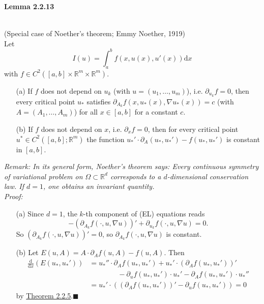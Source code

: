 \hypertarget{lemma_2_2_13}{\textbf{Lemma 2.2.13}}\\
(Special case of Noether's theorem; Emmy Noether, 1919)\\
Let
\[I(u)=\int_a^b{f(x,u(x),u'(x))\mathrm{d}x}\]
with $f\in C^2([a,b]\times\mathbb{R}^m\times\mathbb{R}^m)$.
\begin{itemize}
	\item[(a)] If $f$ does not depend on $u_k$ (with $u=(u_1,\dotsc,u_m)$), i.e. $\partial_{u_k}f=0$, then every critical point $u_*$ satisfies $\partial_{A_k}f(x,u_*(x),\nabla u_*(x))=c$ (with $A=(A_1,\dotsc,A_m)$) for all $x\in[a,b]$ for a constant $c$.
	\item[(b)] If $f$ does not depend on $x$, i.e. $\partial_xf=0$, then for every critical point $u^*\in C^2([a,b];\mathbb{R}^m)$ the function $u_*'\cdot\partial_A(u_*,u_*')-f(u_*,u_*')$ is constant in $[a,b]$.\\
\end{itemize}

\textit{Remark: In its general form, Noether's theorem says: Every continuous symmetry of variational problem on $\Omega\subset\mathbb{R}^d$ corresponds to a $d$-dimensional conservation law. If $d=1$, one obtains an invariant quantity.}\\

\textit{Proof:}
\begin{itemize}
	\item[(a)] Since $d=1$, the $k$-th component of (EL) equations reads
	\[-\left(\partial_{A_k}f(\cdot,u,\nabla u)\right)'+\partial_{u_k}f(\cdot,u,\nabla u)=0.\]
	So $\left(\partial_{A_k}f(\cdot,u,\nabla u)\right)'=0$, so $\partial_{A_k}f(\cdot,u,\nabla u)$ is constant.
	\item[(b)] Let $E(u,A)=A\cdot\partial_Af(u,A)-f(u,A)$. Then
	\begin{align*}
		\frac{\mathrm{d}}{\mathrm{d}x}(E(u_*,u_*'))&=u_*''\cdot\partial_Af(u_*,u_*')+u_*'\cdot(\partial_Af(u_*,u_*'))'\\
		&\qquad\qquad-\partial_uf(u_*,u_*')\cdot u_*'-\partial_Af(u_*,u_*')\cdot u_*''\\
		&=u_*'\cdot\left((\partial_Af(u_*,u_*'))'-\partial_uf(u_*,u_*')\right)=0
	\end{align*}
	by \hyperlink{theorem_2_2_5}{Theorem 2.2.5}.\hfill$\blacksquare$\\[11pt]
\end{itemize}

